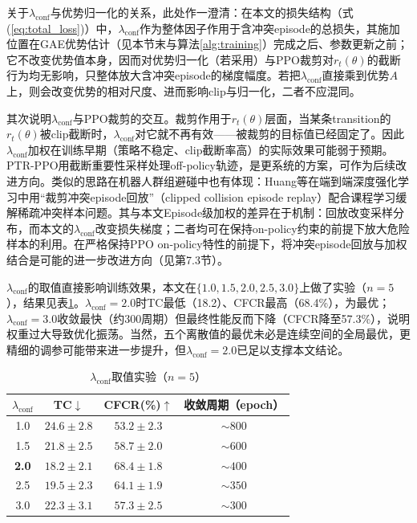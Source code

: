 \documentclass[12pt,a4paper,UTF8]{ctexart}
\begin{document}
关于$\lambda_{\text{conf}}$与优势归一化的关系，此处作一澄清：在本文的损失结构（式(\ref{eq:total_loss})）中，$\lambda_{\text{conf}}$作为整体因子作用于含冲突episode的总损失，其施加位置在GAE优势估计（见本节末与算法\ref{alg:training}）完成之后、参数更新之前；它不改变优势值本身，因而对优势归一化（若采用）与PPO裁剪对$r_t(\theta)$的截断行为均无影响，只整体放大含冲突episode的梯度幅度。若把$\lambda_{\text{conf}}$直接乘到优势$A$上，则会改变优势的相对尺度、进而影响clip与归一化，二者不应混同。

其次说明$\lambda_{\text{conf}}$与PPO裁剪的交互。裁剪作用于$r_t(\theta)$层面，当某条transition的$r_t(\theta)$被clip截断时，$\lambda_{\text{conf}}$对它就不再有效——被裁剪的目标值已经固定了。因此$\lambda_{\text{conf}}$加权在训练早期（策略不稳定、clip截断率高）的实际效果可能弱于预期。PTR-PPO\cite{ref27}用截断重要性采样处理off-policy轨迹，是更系统的方案，可作为后续改进方向。类似的思路在机器人群组避碰中也有体现：Huang等\cite{ref58}在端到端深度强化学习中用“裁剪冲突episode回放”（clipped collision episode replay）配合课程学习缓解稀疏冲突样本问题。其与本文Episode级加权的差异在于机制：回放改变采样分布，而本文的$\lambda_{\text{conf}}$改变损失梯度；二者均可在保持on-policy约束的前提下放大危险样本的利用。在严格保持PPO on-policy特性的前提下，将冲突episode回放与加权结合是可能的进一步改进方向（见第7.3节）。

$\lambda_{\text{conf}}$的取值直接影响训练效果，本文在$\{1.0, 1.5, 2.0, 2.5, 3.0\}$上做了实验（$n=5$），结果见表\ref{tab:lambda}。$\lambda_{\text{conf}}=2.0$时TC最低（18.2）、CFCR最高（68.4\%），为最优；$\lambda_{\text{conf}}=3.0$收敛最快（约300周期）但最终性能反而下降（CFCR降至57.3\%），说明权重过大导致优化振荡。当然，五个离散值的最优未必是连续空间的全局最优，更精细的调参可能带来进一步提升，但$\lambda_{\text{conf}}=2.0$已足以支撑本文结论。

\begin{table}[H]
    \centering
    \caption{$\lambda_{\text{conf}}$取值实验（$n=5$）}
    \label{tab:lambda}
    \begin{tabular}{cccc}
        \toprule
        $\lambda_{\text{conf}}$ & TC$\downarrow$ & CFCR(\%)$\uparrow$ & 收敛周期（epoch） \\
        \midrule
        1.0 & $24.6\pm2.8$ & $53.2\pm2.3$ & $\sim800$ \\
        1.5 & $21.8\pm2.5$ & $58.7\pm2.0$ & $\sim600$ \\
        \textbf{2.0} & $\mathbf{18.2\pm2.1}$ & $\mathbf{68.4\pm1.8}$ & $\sim400$ \\
        2.5 & $19.5\pm2.3$ & $64.1\pm1.9$ & $\sim350$ \\
        3.0 & $22.3\pm3.1$ & $57.3\pm2.5$ & $\sim300$ \\
        \bottomrule
    \end{tabular}
\end{table}
\end{document}
